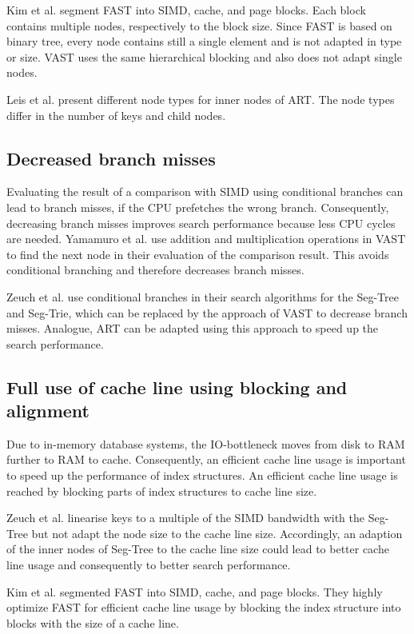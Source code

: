 \documentclass[conference]{IEEEtran}
\begin{document}
Kim et al. segment FAST into SIMD, cache, and page blocks. Each block contains multiple nodes, respectively to the block size. Since FAST is based on binary tree, every node contains still a single element and is not adapted in type or size. VAST uses the same hierarchical blocking and also does not adapt single nodes.

Leis et al. present different node types for inner nodes of ART. The node types differ in the number of keys and child nodes. 

\subsection{Decreased branch misses}
Evaluating the result of a comparison with SIMD using conditional branches can lead to branch misses, if the CPU prefetches the wrong branch. Consequently, decreasing branch misses improves search performance because less CPU cycles are needed. Yamamuro et al. use addition and multiplication operations in VAST to find the next node in their evaluation of the comparison result. This avoids conditional branching and therefore decreases branch misses.

Zeuch et al. use conditional branches in their search algorithms for the Seg-Tree and Seg-Trie, which can be replaced by the approach of VAST to decrease branch misses. Analogue, ART can be adapted using this approach to speed up the search performance.
\subsection{Full use of cache line using blocking and alignment}
Due to in-memory database systems, the IO-bottleneck moves from disk to RAM further to RAM to cache. Consequently, an efficient cache line usage is important to speed up the performance of index structures. An efficient cache line usage is reached by blocking parts of index structures to cache line size.

Zeuch et al. linearise keys to a multiple of the SIMD bandwidth with the Seg-Tree but not adapt the node size to the cache line size. Accordingly, an adaption of the inner nodes of Seg-Tree to the cache line size could lead to better cache line usage and consequently to better search performance. 

Kim et al. segmented FAST into SIMD, cache, and page blocks. They highly optimize FAST for efficient cache line usage by blocking the index structure into blocks with the size of a cache line.
\end{document}
